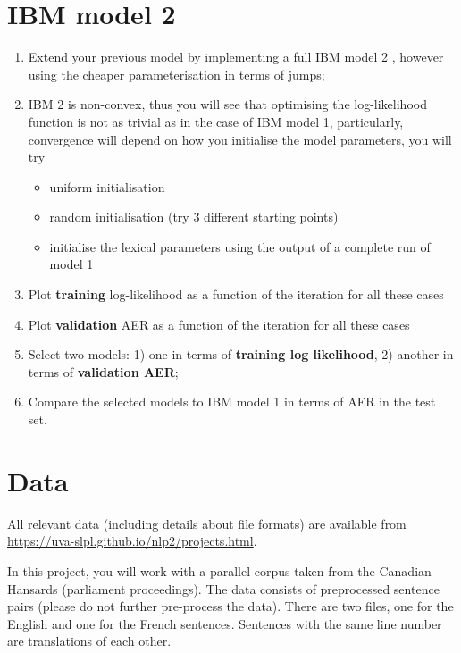 
\section{IBM model 2}

\begin{enumerate}
  \item Extend your previous model by implementing a full IBM model 2 \citep{Brown+1993:smt}, however using the cheaper parameterisation in terms of jumps;
  \item IBM 2 is non-convex, thus you will see that optimising the log-likelihood function is 
        not as trivial as in the case of IBM model 1, particularly, convergence will depend 
        on how you initialise the model parameters, you will try
  \begin{itemize}
    \item uniform initialisation
    \item random initialisation (try 3 different starting points)
    \item initialise the lexical parameters using the output of a complete run of model 1
  \end{itemize}
  \item Plot {\bf training} log-likelihood as a function of the iteration for all these cases
  \item Plot {\bf validation} AER as a function of the iteration for all these cases
  \item Select two models: 1) one in terms of {\bf training log likelihood}, 2) another in terms of {\bf validation AER};
  \item Compare the selected models to IBM model 1 in terms of AER in the test set.
\end{enumerate}


\section{Data}

All relevant data (including details about file formats) are available from \url{https://uva-slpl.github.io/nlp2/projects.html}.

In this project, you will work with a parallel corpus taken from the Canadian Hansards (parliament proceedings). 
The data consists
of preprocessed sentence pairs (please do not further pre-process the data). There are two files, one for the
English and one for the French sentences. Sentences with the same line number are translations of each other.

